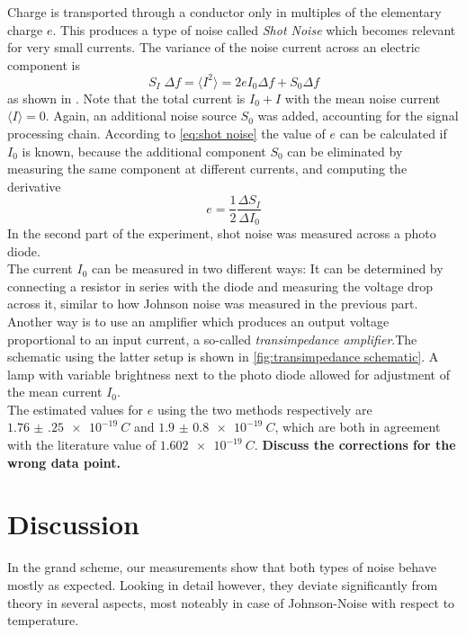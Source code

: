 \documentclass[
    parskip=half, 
    twoside=false,
    twocolumn=true,
    fontsize=11pt,
]{scrarticle}
\begin{document}
Charge is transported through a conductor only in multiples of the elementary charge $e$. This produces a type of noise called \textit{Shot Noise} which becomes relevant for very small currents. The variance of the noise current across an electric component is
\begin{equation}
    \label{eq:shot noise}
    S_I\;\Delta f = \langle I^2 \rangle = 2 e I_0 \Delta f + S_0 \Delta f
\end{equation}
as shown in \autocite{Buch}. Note that the total current is $I_0 + I$ with the mean noise current $\langle I \rangle = 0$. Again, an additional noise source $S_0$ was added, accounting for the signal processing chain. According to \autoref{eq:shot noise} the value of $e$ can be calculated if $I_0$ is known, because the additional component $S_0$ can be eliminated by measuring the same component at different currents, and computing the derivative
\begin{equation}
 e = \frac{1}{2}\frac{\Delta S_I}{\Delta I_0}
\end{equation}
In the second part of the experiment, shot noise was measured across a photo diode. \\
The current $I_0$ can be measured in two different ways: It can be determined by connecting a resistor in series with the diode and measuring the voltage drop across it, similar to how Johnson noise was measured in the previous part. Another way is to use an amplifier which produces an output voltage proportional to an input current, a so-called \textit{transimpedance amplifier}.The schematic using the latter setup is shown in \autoref{fig:transimpedance schematic}. A lamp with variable brightness next to the photo diode allowed for adjustment of the mean current $I_0$.\\
The estimated values for $e$ using the two methods respectively are $\SI{1.76(25)e-19}{C}$ and $\SI{1.9(08)e-19}{C}$, which are both in agreement with the literature value of $\SI{1.602e-19}{C}$.
\textbf{Discuss the corrections for the wrong data point.}

\section{Discussion}
In the grand scheme, our measurements show that both types of noise behave mostly as expected. Looking in detail however, they deviate significantly from theory in several aspects, most noteably in case of Johnson-Noise with respect to temperature.
\end{document}
